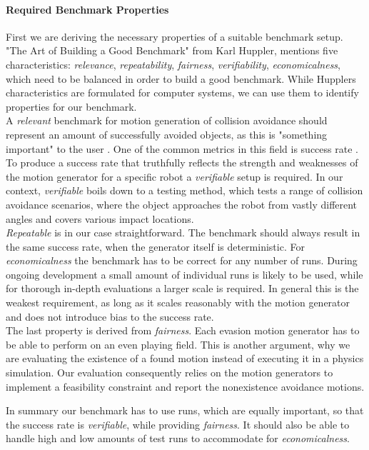 \paragraph{Required Benchmark Properties} \label{par:eval:setup:properties}
First we are deriving the necessary properties of a suitable benchmark setup.
"The Art of Building a Good Benchmark" \cite{huppler_2009} from Karl Huppler, mentions five characteristics: \textit{relevance}, \textit{repeatability}, \textit{fairness}, \textit{verifiability}, \textit{economicalness}, which need to be balanced in order to build a good benchmark.
While Hupplers characteristics are formulated for computer systems, we can use them to identify properties for our benchmark.
\\
A \textit{relevant} benchmark for motion generation of collision avoidance should represent an amount of successfully avoided objects, as this is "something important" to the user \cite{huppler_2009}.
One of the common metrics in this field is success rate \cite{yang_2026,zhang_2026}.
\\
To produce a success rate that truthfully reflects the strength and weaknesses of the motion generator for a specific robot a \textit{verifiable} setup is required.
In our context, \textit{verifiable} boils down to a testing method, which tests a range of collision avoidance scenarios, where the object approaches the robot from vastly different angles and covers various impact locations.
\\
\textit{Repeatable} is in our case straightforward.
The benchmark should always result in the same success rate, when the generator itself is deterministic.
For \textit{economicalness} the benchmark has to be correct for any number of runs.
During ongoing development a small amount of individual runs is likely to be used, while for thorough in-depth evaluations a larger scale is required.
In general this is the weakest requirement, as long as it scales reasonably with the motion generator and does not introduce bias to the success rate.
\\
The last property is derived from \textit{fairness}.
Each evasion motion generator has to be able to perform on an even playing field.
This is another argument, why we are evaluating the existence of a found motion instead of executing it in a physics simulation.
Our evaluation consequently relies on the motion generators to implement a feasibility constraint and report the nonexistence avoidance motions.
\par
In summary our benchmark has to use runs, which are equally important, so that the success rate is \textit{verifiable}, while providing \textit{fairness}.
It should also be able to handle high and low amounts of test runs to accommodate for \textit{economicalness}.

